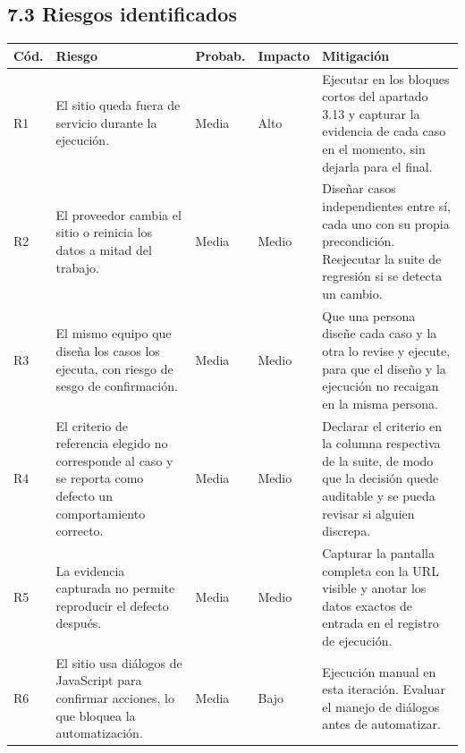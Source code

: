 \documentclass[11pt,a4paper]{article}
\begin{document}
\subsection*{7.3 Riesgos identificados}

\begingroup
\footnotesize
\setlength{\tabcolsep}{4pt}
\renewcommand{\arraystretch}{1.2}
\begin{center}\footnotesize
\begin{minipage}{\textwidth}
\begin{tabularx}{\textwidth}{@{}L{0.9cm} Y L{1.5cm} L{1.5cm} Y@{}}
\toprule
\textbf{Cód.} & \textbf{Riesgo} & \textbf{Probab.} & \textbf{Impacto} & \textbf{Mitigación} \\
\midrule
R1 & El sitio queda fuera de servicio durante la ejecución. & Media & Alto & Ejecutar en los bloques cortos del apartado 3.13 y capturar la evidencia de cada caso en el momento, sin dejarla para el final. \\
R2 & El proveedor cambia el sitio o reinicia los datos a mitad del trabajo. & Media & Medio & Diseñar casos independientes entre sí, cada uno con su propia precondición. Reejecutar la suite de regresión si se detecta un cambio. \\
R3 & El mismo equipo que diseña los casos los ejecuta, con riesgo de sesgo de confirmación. & Media & Medio & Que una persona diseñe cada caso y la otra lo revise y ejecute, para que el diseño y la ejecución no recaigan en la misma persona. \\
R4 & El criterio de referencia elegido no corresponde al caso y se reporta como defecto un comportamiento correcto. & Media & Medio & Declarar el criterio en la columna respectiva de la suite, de modo que la decisión quede auditable y se pueda revisar si alguien discrepa. \\
R5 & La evidencia capturada no permite reproducir el defecto después. & Media & Medio & Capturar la pantalla completa con la URL visible y anotar los datos exactos de entrada en el registro de ejecución. \\
R6 & El sitio usa diálogos de JavaScript para confirmar acciones, lo que bloquea la automatización. & Media & Bajo & Ejecución manual en esta iteración. Evaluar el manejo de diálogos antes de automatizar. \\
\bottomrule
\end{tabularx}
\end{minipage}
\end{center}
\endgroup
\end{document}
